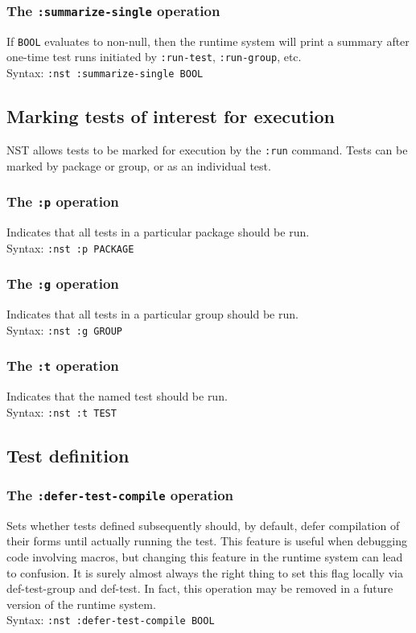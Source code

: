 \subsubsection{The \texttt{:summarize-single} operation}
%
If \texttt{BOOL} evaluates to non-null, then the runtime system will
print a summary after one-time test runs initiated by
\texttt{:run-test}, \texttt{:run-group}, etc.
\\ Syntax: \texttt{:nst :summarize-single BOOL}

\subsection{Marking tests of interest for execution}
\label{nominating-tests}
NST allows tests to be marked for execution by the \texttt{:run}
command.  Tests can be marked by package or group, or as an individual
test.

\subsubsection{The \texttt{:p} operation}
%
Indicates that all tests in a particular package should be run.
\\ Syntax: \texttt{:nst :p PACKAGE}

\subsubsection{The \texttt{:g} operation}
%
Indicates that all tests in a particular group should be run.
\\ Syntax: \texttt{:nst :g GROUP}

\subsubsection{The \texttt{:t} operation}
%
Indicates that the named test should be run.
\\ Syntax: \texttt{:nst :t TEST}

\subsection{Test definition}
\subsubsection{The \texttt{:defer-test-compile} operation}
%
Sets whether tests defined subsequently should, by default, defer
compilation of their forms until actually running the test.  This
feature is useful when debugging code involving macros, but changing
this feature in the runtime system can lead to confusion.  It is
surely almost always the right thing to set this flag locally via
def-test-group and def-test.  In fact, this operation may be removed
in a future version of the runtime system.
\\ Syntax: \texttt{:nst :defer-test-compile BOOL}

